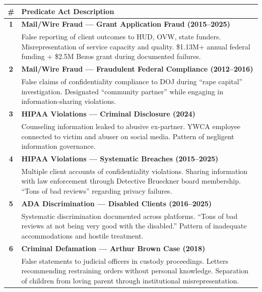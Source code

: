 \documentclass[11pt,letterpaper]{article}
\begin{document}
\begin{longtable}{cp{5in}}
\toprule
\textbf{\#} & \textbf{Predicate Act Description}\\
\midrule
\endhead

\textbf{1} & \textbf{Mail/Wire Fraud --- Grant Application Fraud (2015--2025)}\\
& False reporting of client outcomes to HUD, OVW, state funders. Misrepresentation of service capacity and quality. \$1.13M+ annual federal funding + \$2.5M Bezos grant during documented failures.\\
\midrule

\textbf{2} & \textbf{Mail/Wire Fraud --- Fraudulent Federal Compliance (2012--2016)}\\
& False claims of confidentiality compliance to DOJ during ``rape capital'' investigation. Designated ``community partner'' while engaging in information-sharing violations.\\
\midrule

\textbf{3} & \textbf{HIPAA Violations --- Criminal Disclosure (2024)}\\
& Counseling information leaked to abusive ex-partner. YWCA employee connected to victim and abuser on social media. Pattern of negligent information governance.\\
\midrule

\textbf{4} & \textbf{HIPAA Violations --- Systematic Breaches (2015--2025)}\\
& Multiple client accounts of confidentiality violations. Sharing information with law enforcement through Detective Brueckner board membership. ``Tons of bad reviews'' regarding privacy failures.\\
\midrule

\textbf{5} & \textbf{ADA Discrimination --- Disabled Clients (2016--2025)}\\
& Systematic discrimination documented across platforms. ``Tons of bad reviews at not being very good with the disabled.'' Pattern of inadequate accommodations and hostile treatment.\\
\midrule

\textbf{6} & \textbf{Criminal Defamation --- Arthur Brown Case (2018)}\\
& False statements to judicial officers in custody proceedings. Letters recommending restraining orders without personal knowledge. Separation of children from loving parent through institutional misrepresentation.\\
\midrule


\end{longtable}
\end{document}

